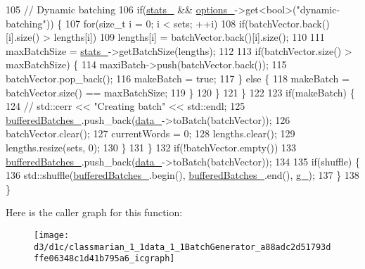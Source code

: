 \begin{DoxyCode}
105         \textcolor{comment}{// Dynamic batching}
106         \textcolor{keywordflow}{if}(\hyperlink{classmarian_1_1data_1_1BatchGenerator_ac951bf49ac81aa01d834391dc1579096}{stats\_} && \hyperlink{classmarian_1_1data_1_1BatchGenerator_a8569748b3bca0d5f30e6e2f4def1b535}{options\_}->get<\textcolor{keywordtype}{bool}>(\textcolor{stringliteral}{"dynamic-batching"})) \{
107           \textcolor{keywordflow}{for}(\textcolor{keywordtype}{size\_t} i = 0; i < sets; ++i)
108             \textcolor{keywordflow}{if}(batchVector.back()[i].size() > lengths[i])
109               lengths[i] = batchVector.back()[i].size();
110 
111           maxBatchSize = \hyperlink{classmarian_1_1data_1_1BatchGenerator_ac951bf49ac81aa01d834391dc1579096}{stats\_}->getBatchSize(lengths);
112 
113           \textcolor{keywordflow}{if}(batchVector.size() > maxBatchSize) \{
114             maxiBatch->push(batchVector.back());
115             batchVector.pop\_back();
116             makeBatch = \textcolor{keyword}{true};
117           \} \textcolor{keywordflow}{else} \{
118             makeBatch = batchVector.size() == maxBatchSize;
119           \}
120         \}
121       \}
122 
123       \textcolor{keywordflow}{if}(makeBatch) \{
124         \textcolor{comment}{// std::cerr << "Creating batch" << std::endl;}
125         \hyperlink{classmarian_1_1data_1_1BatchGenerator_a9e04fb7830ea05e42c0505d4f2077d70}{bufferedBatches\_}.push\_back(\hyperlink{classmarian_1_1data_1_1BatchGenerator_a1605c2a706f55cf89272cd19e2f98cf0}{data\_}->toBatch(batchVector));
126         batchVector.clear();
127         currentWords = 0;
128         lengths.clear();
129         lengths.resize(sets, 0);
130       \}
131     \}
132     \textcolor{keywordflow}{if}(!batchVector.empty())
133       \hyperlink{classmarian_1_1data_1_1BatchGenerator_a9e04fb7830ea05e42c0505d4f2077d70}{bufferedBatches\_}.push\_back(\hyperlink{classmarian_1_1data_1_1BatchGenerator_a1605c2a706f55cf89272cd19e2f98cf0}{data\_}->toBatch(batchVector));
134 
135     \textcolor{keywordflow}{if}(shuffle) \{
136       std::shuffle(\hyperlink{classmarian_1_1data_1_1BatchGenerator_a9e04fb7830ea05e42c0505d4f2077d70}{bufferedBatches\_}.begin(), \hyperlink{classmarian_1_1data_1_1BatchGenerator_a9e04fb7830ea05e42c0505d4f2077d70}{bufferedBatches\_}.end(), 
      \hyperlink{classmarian_1_1data_1_1BatchGenerator_a08b191a4be23424df9c45712f0410a32}{g\_});
137     \}
138   \}
\end{DoxyCode}


Here is the caller graph for this function\+:
\nopagebreak
\begin{figure}[H]
\begin{center}
\leavevmode
\texttt{[image: d3/d1c/classmarian\_1\_1data\_1\_1BatchGenerator\_a88adc2d51793dffe06348c1d41b795a6\_icgraph]}
\end{center}
\end{figure}


